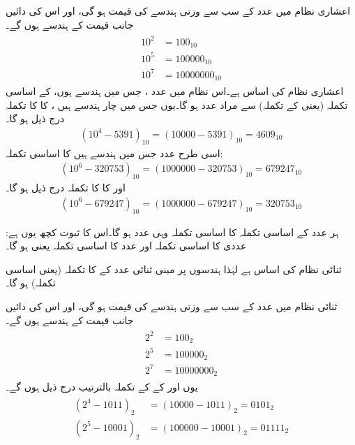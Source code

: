 اعشاری نظام میں عدد         کے  سب سے  وزنی   ہندسے کی قیمت    ہو گی، اور اس  کی  دائیں جانب   قیمت کے    ہندسے ہوں گے۔
\begin{gather}
\begin{aligned}
10^2&=100_{10}\\
10^5&=100000_{10}\\
10^7&=10000000_{10}
\end{aligned}
\end{gather}
اعشاری نظام کی   اساس    ہے۔اس نظام میں  عدد ،    جس میں    ہندسے ہوں،  کے اساسی تکملہ (یعنی    کے تکملہ)  سے مراد عدد  ہو گا۔یوں  جس   میں چار ہندسے    ہیں ، کا    کا تکملہ    درج ذیل ہو گا۔
\begin{align}
(10^4-5391)_{10}=(10000-5391)_{10}=4609_{10}
\end{align}
اسی طرح  عدد    جس میں   ہندسے ہیں کا اساسی تکملہ:
\begin{align}
(10^6-320753)_{10}=(1000000-320753)_{10}=679247_{10}
\end{align} 
اور    کا    کا تکملہ   درج ذیل ہو گا۔ 
\begin{align}
(10^6-679247)_{10}=(1000000-679247)_{10}=320753_{10}
\end{align} 

ہر عدد   کے اساسی تکملہ کا اساسی تکملہ وہی عدد   ہو گا۔اس کا ثبوت کچھ یوں  ہے: عددی  کا اساسی تکملہ  اور عدد    کا اساسی تکملہ  یعنی  ہو گا۔


ثنائی نظام کی   اساس    ہے لہٰذا    ہندسوں پر مبنی ثنائی عدد    کے  کا  تکملہ    (یعنی اساسی تکملہ)       ہو گا۔

ثنائی  نظام میں عدد         کے  سب سے  وزنی   ہندسے کی قیمت    ہو گی، اور اس  کی  دائیں جانب   قیمت کے    ہندسے ہوں گے۔
\begin{gather}
\begin{aligned}
2^2&=100_2\\
2^5&=100000_2\\
2^7&=10000000_2
\end{aligned}
\end{gather}
یوں      اور    کے     کے تکملہ   بالترتیب  درج ذیل ہوں گے۔
\begin{gather}
\begin{aligned}\label{مساوات_حساب_تکملہ_اساسی}
(2^4-1011)_2&=(10000-1011)_2=0101_2\\
(2^5-10001)_2&=(100000-10001)_2=01111_2
\end{aligned}
\end{gather} 


